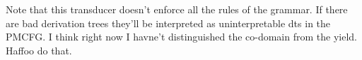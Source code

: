 \documentclass[12pt]{article}
\theoremstyle{definition}
\newtheorem{definition}{Definition}[section]
\begin{document}
Note that this transducer doesn't enforce all the rules of the grammar. If there are bad derivation trees they'll be interpreted as uninterpretable dts in the PMCFG. I think right now I havne't distinguished the co-domain from the yield. Haffoo do that.











\end{document}
